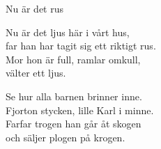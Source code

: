 \begin{song}{Nu är det rus}
	
	
	
	Nu är det ljus här i vårt hus,\\
	far han har tagit sig ett riktigt rus.\\
	Mor hon är full, ramlar omkull,\\
	välter ett ljus.
	
	Se hur alla barnen brinner inne.\\
	Fjorton stycken, lille Karl i minne.\\
	Farfar trogen han går åt skogen\\
	och säljer plogen på krogen.
	
\end{song}
